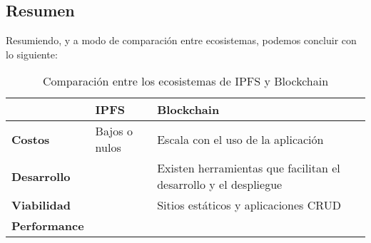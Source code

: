 \subsection{Resumen}

Resumiendo, y a modo de comparación entre ecosistemas, podemos concluir con lo siguiente:

\setlength\tabcolsep{1pt}
\begin{table}[H]
    \centering
    \begin{tabular}{|m{7em}|m{14em}|m{14em}|}
    \hline
     & \textbf{IPFS} & \textbf{Blockchain} \\
    \hline
    \textbf{Costos} & Bajos o nulos & Escala con el uso de la aplicación \\
    \hline
    \textbf{Desarrollo} &  & Existen herramientas que facilitan el desarrollo y el despliegue \\
    \hline
    \textbf{Viabilidad} & & Sitios estáticos y aplicaciones CRUD \\
    \hline
    \textbf{Performance} & & \\
    \hline
    \end{tabular}
    \caption{Comparación entre los ecosistemas de IPFS y Blockchain}
\end{table}